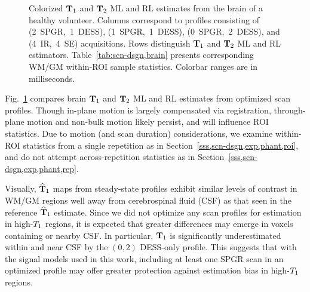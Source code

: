 \begin{figure*} [!tbp]
	\centering
	\vspace{0cm}
	\caption{
		Colorized $\mathbf{T}_1$ and $\mathbf{T}_2$ ML and RL estimates 
		from the brain of a healthy volunteer.
		Columns correspond to profiles consisting 
		of (2~SPGR,~1~DESS), (1~SPGR,~1~DESS), (0~SPGR,~2~DESS), 
		and (4~IR,~4~SE) acquisitions.  
		Rows distinguish $\mathbf{T}_1$ and $\mathbf{T}_2$ ML and RL estimators.
		Table~\ref{tab:scn-dsgn,brain} presents corresponding WM/GM 
		within-ROI sample statistics.
		Colorbar ranges are in milliseconds.
	}
	\label{fig:scn-dsgn,brain,jet}
\end{figure*}

Fig.~\ref{fig:scn-dsgn,brain,jet} compares 
brain $\mathbf{T}_1$ and $\mathbf{T}_2$ ML and RL estimates 
from optimized scan profiles.
Though in-plane motion is largely compensated via registration, 
through-plane motion and non-bulk motion likely persist, 
and will influence ROI statistics.
Due to motion (and scan duration) considerations,
we examine within-ROI statistics from a single repetition 
as in Section~\ref{sss,scn-dsgn,exp,phant,roi}, 
and do not attempt across-repetition statistics 
as in Section~\ref{sss,scn-dsgn,exp,phant,rep}.
	
Visually, $\widehat{\mathbf{T}}_1$ maps from steady-state profiles 
exhibit similar levels of contrast 
in WM/GM regions well away 
from cerebrospinal fluid (CSF) as that seen 
in the reference $\widehat{\mathbf{T}}_1$ estimate.
Since we did not optimize any scan profiles 
for estimation in high-$T_1$ regions, 
it is expected that greater differences may emerge 
in voxels containing or nearby CSF. 
In particular, 
$\mathbf{T}_1$ is significantly underestimated 
within and near CSF by the $(0,2)$ DESS-only profile. 
This suggests that with the signal models used in this work, 
including at least one SPGR scan in an optimized profile 
may offer greater protection 
against estimation bias in high-$T_1$ regions.

